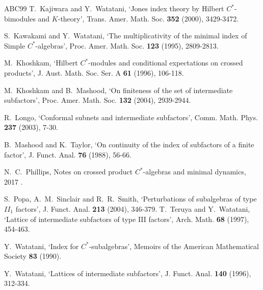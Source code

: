 \documentclass{amsart}
\numberwithin{equation}{section}
\newcommand{\1}{\mathbf{1}}
\begin{document}
\begin{thebibliography}{ABC99}
   T.~Kajiwara and Y.~Watatani, `Jones index theory by Hilbert $C^*$-bimodules and $K$-theory', Trans. Amer. Math. Soc. {\bf 352} (2000), 3429-3472. 


 S.~Kawakami and Y.~Watatani, `The multiplicativity of the minimal index of Simple $C^*$-algebras', Proc. Amer. Math. Soc. {\bf 123} (1995), 2809-2813. 

 M.~Khoshkam, `Hilbert $C^*$-modules and conditional expectations on crossed products', J. Aust. Math. Soc. Ser. A {\bf 61} (1996), 106-118.

   M.~Khoshkam and B.~Mashood, `On finiteness of the set of
  intermediate subfactors', Proc. Amer. Math. Soc. {\bf 132} (2004), 2939-2944.

  


 R.~Longo, `Conformal subnets and intermediate subfactors', Comm. Math. Phys. {\bf 237} (2003), 7-30.

  
 B.~Mashood and K.~Taylor, `On continuity of the index of subfactors of a finite factor', J. Funct. Anal. {\bf 76} (1988), 56-66.

 N.~C.~Phillips, Notes on crossed product $C^*$-algebras and minimal dynamics, 2017 .

 S.~Popa, A.~M.~Sinclair and R.~R.~Smith, `Perturbations of subalgebras of type $II_1$ factors', J. Funct. Anal. {\bf 213} (2004),
346-379.
 T.~Teruya and Y.~Watatani, `Lattice of intermediate subfactors of type III factors', Arch. Math. {\bf 68} (1997), 454-463.

 Y.~Watatani, `Index for $C^*$-subalgebras', Memoirs of the American Mathematical Society \textbf{83} (1990).

 Y.~Watatani, `Lattices of intermediate subfactors', J. Funct. Anal. {\bf 140} (1996), 312-334.

\end{thebibliography}
\end{document}
